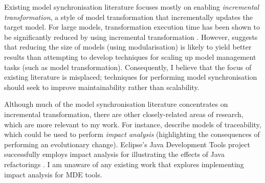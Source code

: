 Existing model synchronisation literature focuses mostly on enabling \textit{incremental transformation}, a style of model transformation that incrementally updates the target model. For large models, transformation execution time has been shown to be significantly reduced by using incremental transformation \cite{hearnden06incremental}. However, \cite{kolovos08scalability} suggests that reducing the size of models (using modularisation) is likely to yield better results than attempting to develop techniques for scaling up model management tasks (such as model transformation). Consequently, I believe that the focus of existing literature is misplaced; techniques for performing model synchronisation should seek to improve maintainability rather than scalability.  %

Although much of the model synchronisation literature concentrates on incremental transformation, there are other closely-related areas of research, which are more relevant to my work. For instance, \cite{jouault05loosely,drivalos08loosely} describe models of traceability, which could be used to perform \textit{impact analysis} (highlighting the consequences of performing an evolutionary change). Eclipse's Java Development Tools project successfully employs impact analysis for illustrating the effects of Java refactorings \cite{fuhrer07refactoring}. I am unaware of any existing work that explores implementing impact analysis for MDE tools.